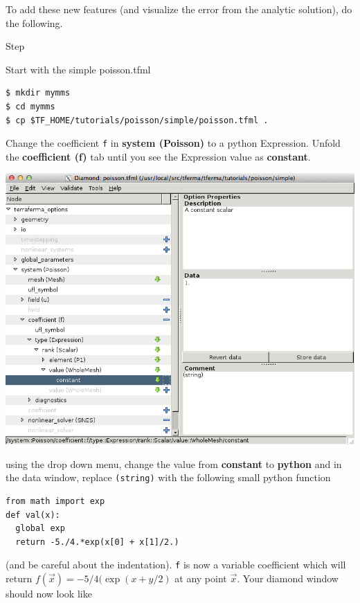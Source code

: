 To add these new features (and visualize the error from the analytic solution), do the following.
\begin{steps}{Step}
\item  Start with the simple poisson.tfml
  \begin{lstlisting}[style=Bash]
$ mkdir mymms
$ cd mymms
$ cp $TF_HOME/tutorials/poisson/simple/poisson.tfml .    
  \end{lstlisting}
\item Change the coefficient \texttt{f} in \textbf{system (Poisson)} to a python Expression. Unfold the \textbf{coefficient (f)} tab until you see the Expression value as \textbf{constant}. 
\begin{center}
\includegraphics[width=\diamondwidth]{figures/screendumps/diamond_poisson_f_value.png}
  \end{center}
\item using the drop down menu, change the value from \textbf{constant} to \textbf{python} and in the data window, replace \texttt{(string)} with the following small python function
  \begin{lstlisting}[style=python]
from math import exp
def val(x):
  global exp
  return -5./4.*exp(x[0] + x[1]/2.)   
  \end{lstlisting}
(and be careful about the indentation). \texttt{f} is now a variable coefficient which will return $f(\vec{x}) = -5/4(\exp(x + y/2)$ at any point $\vec{x}$. Your diamond window should now look like
\begin{center}

\end{center}
\end{steps}
